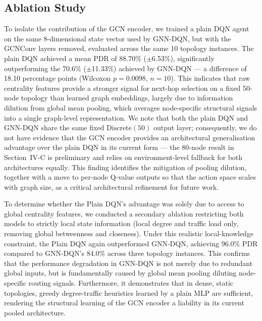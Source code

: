 \documentclass[conference]{IEEEtran}
\begin{document}
\subsection{Ablation Study}

To isolate the contribution of the GCN encoder, we trained a
plain DQN agent on the same 8-dimensional state vector used by
GNN-DQN, but with the GCNConv layers removed, evaluated across the
same 10 topology instances. The plain DQN achieved a mean PDR of
88.70\% ($\pm$6.53\%), significantly outperforming the 70.6\%
($\pm$11.33\%) achieved by GNN-DQN — a difference of 18.10
percentage points (Wilcoxon $p=0.0098$, $n=10$).
This indicates that raw centrality features provide a stronger
signal for next-hop selection on a fixed 50-node topology than
learned graph embeddings, largely due to information dilution from
global mean pooling, which averages node-specific structural
signals into a single graph-level representation. We note that
both the plain DQN and GNN-DQN share the same fixed
 $\text{Discrete}(50)$ output layer; consequently, we do not have
evidence that the GCN encoder provides an architectural
generalisation advantage over the plain DQN in its current form —
the 80-node result in Section~IV-C is preliminary and relies on
environment-level fallback for both architectures equally. This
finding identifies the mitigation of pooling dilution, together
with a move to per-node Q-value outputs so that the action space
scales with graph size, as a critical architectural refinement for
future work.

To determine whether the Plain DQN's advantage was solely due to
access to global centrality features, we conducted a secondary
ablation restricting both models to strictly local state
information (local degree and traffic load only, removing global
betweenness and closeness). Under this realistic local-knowledge
constraint, the Plain DQN again outperformed GNN-DQN, achieving
96.0\% PDR compared to GNN-DQN's 84.0\% across three topology
instances. This confirms that the performance degradation in
GNN-DQN is not merely due to redundant global inputs, but is
fundamentally caused by global mean pooling diluting node-specific
routing signals. Furthermore, it demonstrates that in dense,
static topologies, greedy degree-traffic heuristics learned by a
plain MLP are sufficient, rendering the structural learning of the
GCN encoder a liability in its current pooled architecture.
\end{document}
